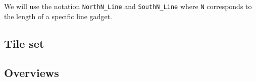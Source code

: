 We will use the notation {\tt NorthN\_Line} and {\tt SouthN\_Line} where {\tt N} corresponds to the length of a specific line gadget.


\subsection{ Tile set }








\subsection{Overviews}

\begin{figure}[H]
    \centering
    \begin{subfigure}[t]{0.3\textwidth}
        \centering

\end{subfigure}
\end{figure}
